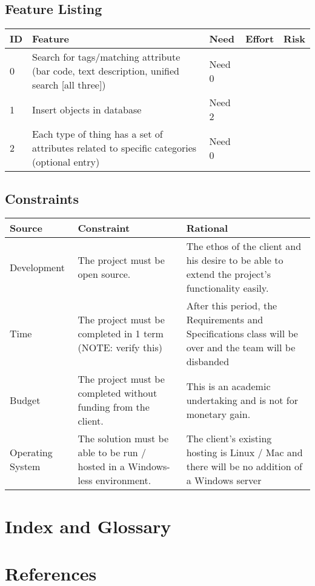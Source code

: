 \documentclass{article}
\begin{document}
\subsection{Feature Listing}
\begin{tabular}{ | p{0.25in} | p{3.25in} | p{0.5in} | p{0.5in} | p{0.5in} | }
\hline
ID & Feature & Need & Effort & Risk\\
\hline
0 & Search for tags/matching attribute (bar code, text description, unified search [all three]) & Need 0 &  & \\
\hline
1 & Insert objects in database & Need 2 &  & \\
\hline
2 & Each type of thing has a set of attributes related to specific categories (optional entry) & Need 0 &  & \\
\hline
\end{tabular}

\subsection{Constraints}
\begin{tabular}{ | p{1.2in} | p{2.4in} | p{2.4in} | }
\hline
Source & Constraint & Rational\\
\hline
Development & The project must be open source. & The ethos of the client and his desire to be able to extend the project’s functionality easily.\\
\hline
Time & The project must be completed in 1 term (NOTE: verify this) & After this period, the Requirements and Specifications class will be over and the team will be disbanded\\
\hline
Budget & The project must be completed without funding from the client. & This is an academic undertaking and is not for monetary gain.\\
\hline
Operating System & The solution must be able to be run / hosted in a Windows-less environment. & The client’s existing hosting is Linux / Mac and there will be no addition of a Windows server\\
\hline
\end{tabular}

\section{Index and Glossary}

\section{References}
\end{document}
